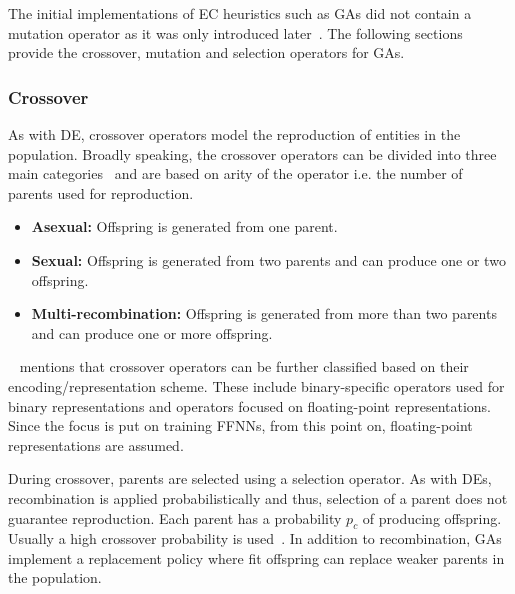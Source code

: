 \noindent
The initial implementations of \acs{EC} heuristics such as \acp{GA} did not contain a mutation operator as it was only introduced later~\cite{ref:engelbrecht:2007}. The following sections provide the crossover, mutation and selection operators for \acp{GA}.

\subsubsection{Crossover}\label{sec:heuristics:mh:ga:crossover}

As with \acs{DE}, crossover operators model the reproduction of entities in the population. Broadly speaking, the crossover operators can be divided into three main categories~\cite{ref:engelbrecht:2007} and are based on arity of the operator i.e. the number of parents used for reproduction.

\begin{itemize}
      \item \textbf{Asexual:} Offspring is generated from one parent.

      \item \textbf{Sexual:} Offspring is generated from two parents and can produce one or two offspring.

      \item \textbf{Multi-recombination:} Offspring is generated from more than two parents and can produce one or more offspring.
\end{itemize}

\noindent
\citeauthor{ref:engelbrecht:2007}~\cite{ref:engelbrecht:2007} mentions that crossover operators can be further classified based on their encoding/representation scheme. These include binary-specific operators used for binary representations and operators focused on floating-point representations. Since the focus is put on training \acp{FFNN}, from this point on, floating-point representations are assumed.

During crossover, parents are selected using a selection operator. As with \acp{DE}, recombination is applied probabilistically and thus, selection of a parent does not guarantee reproduction. Each parent has a probability $p_{c}$ of producing offspring. Usually a high crossover probability is used~\cite{ref:engelbrecht:2007}. In addition to recombination, \acp{GA} implement a replacement policy where fit offspring can replace weaker parents in the population.

